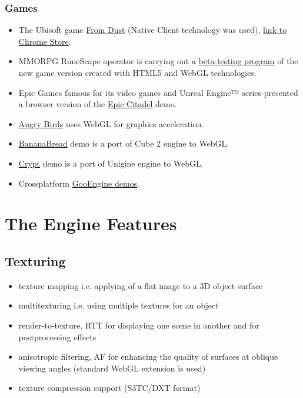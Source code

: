 \documentclass[a4paper,12pt,oneside]{sphinxmanual}
\begin{document}
\subsection{Games}
\label{about:id23}\begin{itemize}
\item {} 
The Ubisoft game \href{http://from-dust.ubisoft.com/}{From Dust} (Native Client technology was used), \href{https://chrome.google.com/webstore/detail/from-dust/anelkojiepicmcldgnmkplocifmegpfj?hl=en}{link to Chrome Store}.

\item {} 
MMORPG RuneScape operator is carrying out a \href{http://www.runescape.com/beta}{beta-testing program} of the new game version created with HTML5 and WebGL technologies.

\item {} 
Epic Games famous for its video games and Unreal Engine™ series presented a browser version of the \href{http://www.unrealengine.com/html5/}{Epic Citadel} demo.

\item {} 
\href{http://chrome.angrybirds.com/}{Angry Birds} uses WebGL for graphics acceleration.

\item {} 
\href{https://developer.mozilla.org/en/demos/detail/bananabread}{BananaBread} demo is a port of Cube 2 engine to WebGL.

\item {} 
\href{http://crypt-webgl.unigine.com/}{Crypt} demo is a port of Unigine engine to WebGL.

\item {} 
Crossplatform \href{http://www.gooengine.com/demos}{GooEngine demos}.

\end{itemize}


\chapter{The Engine Features}
\label{features::doc}\label{features:features}\label{features:id1}

\section{Texturing}
\label{features:id2}\begin{itemize}
\item {} 
texture mapping i.e. applying of a flat image to a 3D object surface

\item {} 
multitexturing i.e. using multiple textures for an object

\item {} 
render-to-texture, RTT for displaying one scene in another and for postprocessing effects

\item {} 
anisotropic filtering, AF for enhancing the quality of surfaces at oblique viewing angles (standard WebGL extension is used)

\item {} 
texture compression support (S3TC/DXT format)

\end{itemize}
\end{document}
